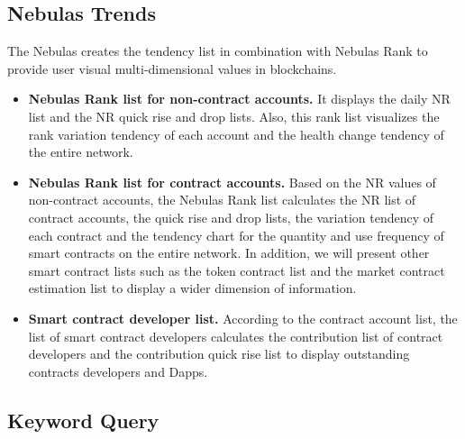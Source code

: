 \subsection{Nebulas Trends}

The Nebulas creates the tendency list in combination with Nebulas Rank to provide user visual multi-dimensional values in blockchains.

\begin{itemize}
\item \textbf{Nebulas Rank list for non-contract accounts.} It displays the daily NR list and the NR quick rise and drop lists. Also, this rank list visualizes the rank variation tendency of each account and the health change tendency of the entire network.
\item \textbf{Nebulas Rank list for contract accounts.} Based on the NR values of non-contract accounts, the Nebulas Rank list calculates the NR list of contract accounts, the quick rise and drop lists, the variation tendency of each contract and the tendency chart for the quantity and use frequency of smart contracts on the entire network. In addition, we will present other smart contract lists such as the token contract list and the market contract estimation list to display a wider dimension of information.
\item \textbf{Smart contract developer list.} According to the contract account list, the list of smart contract developers calculates the contribution list of contract developers and the contribution quick rise list to display outstanding contracts developers and Dapps.
\end{itemize}

\subsection{Keyword Query}

